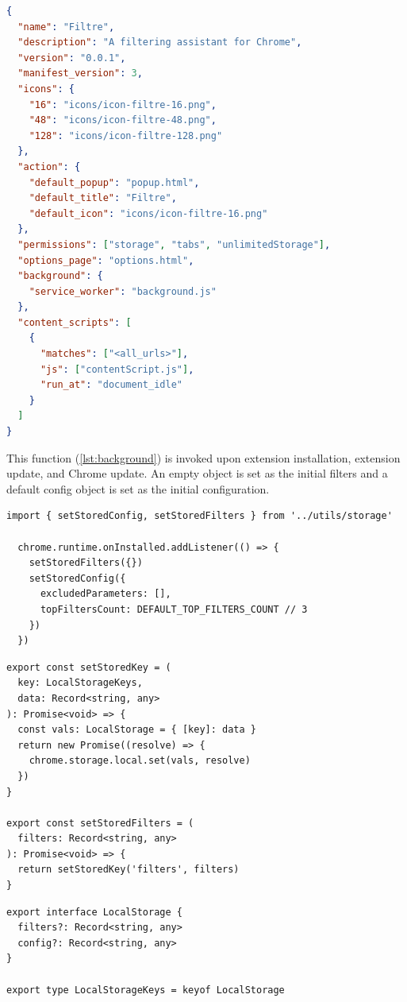 \begin{lstlisting}[language=json, caption={Manifest File (JSON)}, label={lst:manifest}]
{
  "name": "Filtre",
  "description": "A filtering assistant for Chrome",
  "version": "0.0.1",
  "manifest_version": 3,
  "icons": {
    "16": "icons/icon-filtre-16.png",
    "48": "icons/icon-filtre-48.png",
    "128": "icons/icon-filtre-128.png"
  },
  "action": {
    "default_popup": "popup.html",
    "default_title": "Filtre",
    "default_icon": "icons/icon-filtre-16.png"
  },
  "permissions": ["storage", "tabs", "unlimitedStorage"],
  "options_page": "options.html",
  "background": {
    "service_worker": "background.js"
  },
  "content_scripts": [
    {
      "matches": ["<all_urls>"],
      "js": ["contentScript.js"],
      "run_at": "document_idle"
    }
  ]
}
\end{lstlisting}

This function (\autoref{lst:background}) is invoked upon extension installation, extension update, and Chrome update. An empty object is set as the initial filters and a default config object is set as the initial configuration.

\begin{lstlisting}[style=ES6, caption={On install functions (TypeScript)}, label={lst:background}]
  import { setStoredConfig, setStoredFilters } from '../utils/storage'

  chrome.runtime.onInstalled.addListener(() => {
    setStoredFilters({})
    setStoredConfig({
      excludedParameters: [],
      topFiltersCount: DEFAULT_TOP_FILTERS_COUNT // 3
    })
  })
\end{lstlisting}

\begin{lstlisting}[style=ES6, caption={Helper functions for Chrome Storage API (TypeScript)}]
export const setStoredKey = (
  key: LocalStorageKeys,
  data: Record<string, any>
): Promise<void> => {
  const vals: LocalStorage = { [key]: data }
  return new Promise((resolve) => {
    chrome.storage.local.set(vals, resolve)
  })
}

export const setStoredFilters = (
  filters: Record<string, any>
): Promise<void> => {
  return setStoredKey('filters', filters)
}
\end{lstlisting}

\begin{lstlisting}[style=ES6, caption={TypeScript interface of a LocalStorage object (TypeScript)}]
export interface LocalStorage {
  filters?: Record<string, any>
  config?: Record<string, any>
}

export type LocalStorageKeys = keyof LocalStorage
\end{lstlisting}

